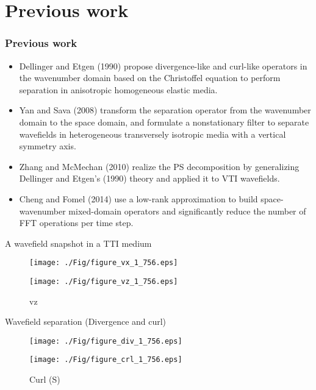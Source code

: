 \documentclass[aspectratio=169]{beamer}
\begin{document}
\section{Previous work}
\begin{frame}
  \frametitle{Previous work}
\begin{itemize}
\item{Dellinger and Etgen (1990) propose divergence-like and curl-like operators in the wavenumber domain based on the Christoffel equation to perform separation in anisotropic homogeneous elastic media.}
\item{Yan and Sava (2008) transform the separation operator from the wavenumber domain to the space domain, and formulate a nonstationary filter to separate wavefields in heterogeneous transversely isotropic media with a vertical symmetry axis.}
\item{Zhang and McMechan (2010) realize the PS decomposition by generalizing Dellinger and Etgen's (1990) theory and applied it to VTI wavefields.}
\item{Cheng and Fomel (2014) use a low-rank approximation to build space-wavenumber mixed-domain operators and significantly reduce the number of FFT operations per time step.}
\end{itemize}
\end{frame}
\begin{frame}{A wavefield snapshot in a TTI medium}
   \begin{figure}[ht]
        \begin{minipage}[b]{0.45\linewidth}
            \centering
            \texttt{[image: ./Fig/figure\_vx\_1\_756.eps]}
            \caption{vx}
        \end{minipage}
        \hspace{0.5cm}
        \begin{minipage}[b]{0.45\linewidth}
            \centering
            \texttt{[image: ./Fig/figure\_vz\_1\_756.eps]}
            \caption{vz}
        \end{minipage}
    \end{figure}

\end{frame}
\begin{frame}{Wavefield separation (Divergence and curl)}
   \begin{figure}[ht]
        \begin{minipage}[b]{0.45\linewidth}
            \centering
            \texttt{[image: ./Fig/figure\_div\_1\_756.eps]}
            \caption{Divergence (P)}
        \end{minipage}
        \hspace{0.5cm}
        \begin{minipage}[b]{0.45\linewidth}
            \centering
            \texttt{[image: ./Fig/figure\_crl\_1\_756.eps]}
            \caption{Curl (S)}
        \end{minipage}
    \end{figure}
\end{frame}
\end{document}
